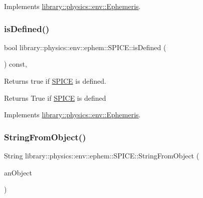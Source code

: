 Implements \hyperlink{classlibrary_1_1physics_1_1env_1_1_ephemeris_a7ddecd88d91f79ff204100eb9607b591}{library\+::physics\+::env\+::\+Ephemeris}.

\mbox{\label{classlibrary_1_1physics_1_1env_1_1ephem_1_1_s_p_i_c_e_a54fb3fb8768a72f515231dac083eb9cb}} 
\subsubsection{\texorpdfstring{is\+Defined()}{isDefined()}}
{\footnotesize\ttfamily bool library\+::physics\+::env\+::ephem\+::\+S\+P\+I\+C\+E\+::is\+Defined (\begin{DoxyParamCaption}{ }\end{DoxyParamCaption}) const\hspace{0.3cm}{\ttfamily [override]}, {\ttfamily [virtual]}}



Returns true if \hyperlink{classlibrary_1_1physics_1_1env_1_1ephem_1_1_s_p_i_c_e}{S\+P\+I\+CE} is defined. 

\begin{DoxyReturn}{Returns}
True if \hyperlink{classlibrary_1_1physics_1_1env_1_1ephem_1_1_s_p_i_c_e}{S\+P\+I\+CE} is defined 
\end{DoxyReturn}


Implements \hyperlink{classlibrary_1_1physics_1_1env_1_1_ephemeris_abf61a03e24dd146199381db14d1d7c68}{library\+::physics\+::env\+::\+Ephemeris}.

\mbox{\label{classlibrary_1_1physics_1_1env_1_1ephem_1_1_s_p_i_c_e_aebeefe1b806d93e576a0b08c8d24b250}} 
\subsubsection{\texorpdfstring{String\+From\+Object()}{StringFromObject()}}
{\footnotesize\ttfamily String library\+::physics\+::env\+::ephem\+::\+S\+P\+I\+C\+E\+::\+String\+From\+Object (\begin{DoxyParamCaption}\item[{const \hyperlink{classlibrary_1_1physics_1_1env_1_1ephem_1_1_s_p_i_c_e_a86f1a863677210ba8884807cc725c0f8}{S\+P\+I\+C\+E\+::\+Object} \&}]{an\+Object }\end{DoxyParamCaption})\hspace{0.3cm}{\ttfamily [static]}}



